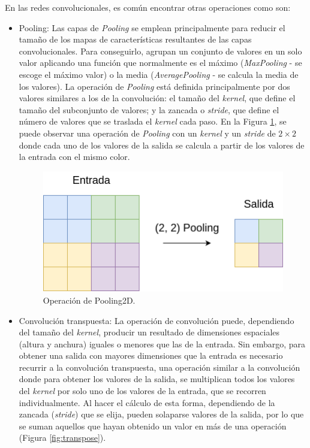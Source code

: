 En las redes convolucionales, es común encontrar otras operaciones como son:
\begin{itemize}
\item Pooling: Las capas de \textit{Pooling} se emplean principalmente para reducir el tamaño de los mapas de características resultantes de las capas convolucionales. Para conseguirlo, agrupan un conjunto de valores en un solo valor aplicando una función que normalmente es el máximo (\textit{MaxPooling} - se escoge el máximo valor) o la media (\textit{AveragePooling} - se calcula la media de los valores). La operación de \textit{Pooling} está definida principalmente por dos valores similares a los de la convolución: el tamaño del \textit{kernel}, que define el tamaño del subconjunto de valores; y la zancada o \textit{stride}, que define el número de valores que se traslada el \textit{kernel} cada paso. En la Figura \ref{fig:pooling}, se puede observar una operación de \textit{Pooling} con un \textit{kernel} y un \textit{stride} de $2\times2$ donde cada uno de los valores de la salida se calcula a partir de los valores de la entrada con el mismo color.

\begin{figure}[H]
\centering
\includegraphics[width=0.5\linewidth]{imagenes/pooling.png} 
\captionsetup{width=.5\linewidth}
\caption{Operación de Pooling2D.}
\label{fig:pooling}
\end{figure}

\item Convolución transpuesta: La operación de convolución puede, dependiendo del tamaño del \textit{kernel}, producir un resultado de dimensiones espaciales (altura y anchura) iguales o menores que las de la entrada. Sin embargo, para obtener una salida con mayores dimensiones que la entrada es necesario recurrir a la convolución transpuesta, una operación similar a la convolución donde para obtener los valores de la salida, se multiplican todos los valores del \textit{kernel} por solo uno de los valores de la entrada, que se recorren individualmente. Al hacer el cálculo de esta forma, dependiendo de la zancada (\textit{stride}) que se elija, pueden solaparse valores de la salida, por lo que se suman aquellos que hayan obtenido un valor en más de una operación (Figura \ref{fig:transpose}).


\end{itemize}
